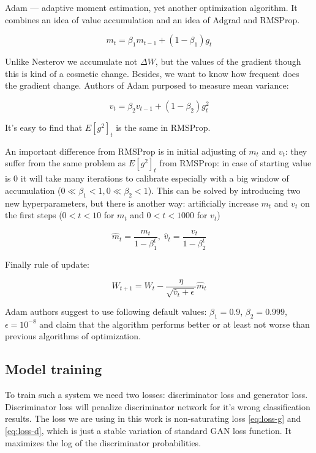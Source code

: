 Adam — adaptive moment estimation, yet another optimization algorithm. It combines an idea of value accumulation and an idea of Adgrad and RMSProp.

\begin{equation}
    m_t = \beta_1 m_{t-1} + (1 - \beta_1) g_t
\end{equation}

Unlike Nesterov we accumulate not $\Delta W$, but the values of the gradient though this is kind of a cosmetic change. Besides, we want to know how frequent does the gradient change. Authors of Adam purposed to measure mean variance:


\begin{equation}
    v_t = \beta_2 v_{t-1} + (1 - \beta_2) g_t^2
\end{equation}

It's easy to find that $E[g^2]_t$ is the same in RMSProp.

An important difference from RMSProp is in initial adjusting of $m_t$ and $v_t$: they suffer from the same problem as $E[g^2]_t$ from RMSProp: in case of starting value is $0$ it will take many iterations to calibrate especially with a big window of accumulation ($0 \ll \beta_1 < 1, 0 \ll \beta_2 < 1$). This can be solved by introducing two new hyperparameters, but there is another way: artificially increase $m_t$ and $v_t$ on the first steps ($0 < t < 10$ for $m_t$ and $0 < t < 1000$ for $v_t$)

\begin{equation}
    \hat{m}_t = \frac{m_t}{1 - \beta^t_1}, \;
    \hat{v}_t = \frac{v_t}{1 - \beta^t_2}
\end{equation}

Finally rule of update:

\begin{equation}
    W_{t+1} = W_{t} - \dfrac{\eta}{\sqrt{\hat{v}_t + \epsilon}} \hat{m}_t
\end{equation}

Adam authors suggest to use following default values: $\beta_1 = 0.9$, $\beta_2 = 0.999$, $\epsilon = 10^{-8}$ and claim that the algorithm performs better or at least not worse than previous algorithms of optimization.

\subsection{Model training}

To train such a system we need two losses: discriminator loss and generator loss. Discriminator loss will penalize discriminator network for it's wrong classification results. The loss we are using in this work is non-saturating loss \ref{eq:loss-g} and \ref{eq:loss-d}, which is just a stable variation of standard GAN loss function. It maximizes the log of the discriminator probabilities.

